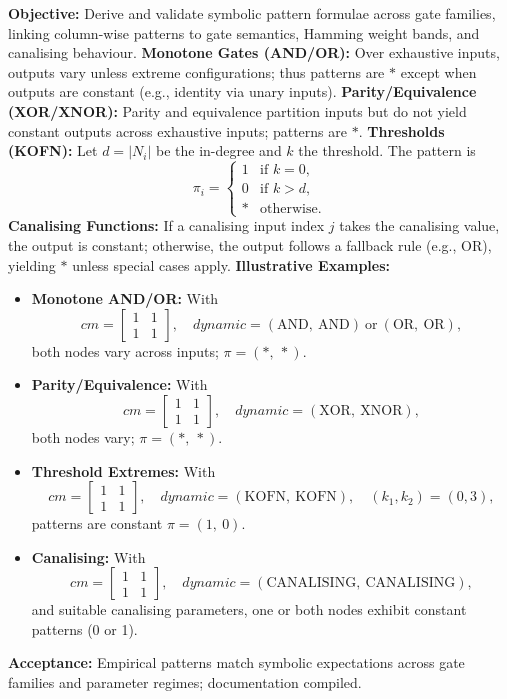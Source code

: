 \textbf{Objective:} Derive and validate symbolic pattern formulae across gate families, linking column-wise patterns to gate semantics, Hamming weight bands, and canalising behaviour.
\textbf{Monotone Gates (AND/OR):} Over exhaustive inputs, outputs vary unless extreme configurations; thus patterns are \(*\) except when outputs are constant (e.g., identity via unary inputs).
\textbf{Parity/Equivalence (XOR/XNOR):} Parity and equivalence partition inputs but do not yield constant outputs across exhaustive inputs; patterns are \(*\).
\textbf{Thresholds (KOFN):} Let \(d=\lvert N_i\rvert\) be the in-degree and \(k\) the threshold. The pattern is
\[
\pi_i=\begin{cases}
1 & \text{if } k=0,\\
0 & \text{if } k>d,\\
* & \text{otherwise.}
\end{cases}
\]
\textbf{Canalising Functions:} If a canalising input index \(j\) takes the canalising value, the output is constant; otherwise, the output follows a fallback rule (e.g., OR), yielding \(*\) unless special cases apply.
\textbf{Illustrative Examples:}
\begin{itemize}
\item \textbf{Monotone AND/OR:} With
\[
cm = \begin{bmatrix}1 & 1\\ 1 & 1\end{bmatrix},\quad dynamic=(\text{AND},\ \text{AND})\ \text{or}\ (\text{OR},\ \text{OR}),
\]
both nodes vary across inputs; \(\pi=(*,\ *)\).
\item \textbf{Parity/Equivalence:} With
\[
cm = \begin{bmatrix}1 & 1\\ 1 & 1\end{bmatrix},\quad dynamic=(\text{XOR},\ \text{XNOR}),
\]
both nodes vary; \(\pi=(*,\ *)\).
\item \textbf{Threshold Extremes:} With
\[
cm = \begin{bmatrix}1 & 1\\ 1 & 1\end{bmatrix},\quad dynamic=(\text{KOFN},\ \text{KOFN}),\quad (k_1, k_2)=(0,3),
\]
patterns are constant \(\pi=(1,\ 0)\).
\item \textbf{Canalising:} With
\[
cm = \begin{bmatrix}1 & 1\\ 1 & 1\end{bmatrix},\quad dynamic=(\text{CANALISING},\ \text{CANALISING}),
\]
and suitable canalising parameters, one or both nodes exhibit constant patterns (0 or 1).
\end{itemize}
\textbf{Acceptance:} Empirical patterns match symbolic expectations across gate families and parameter regimes; documentation compiled.

